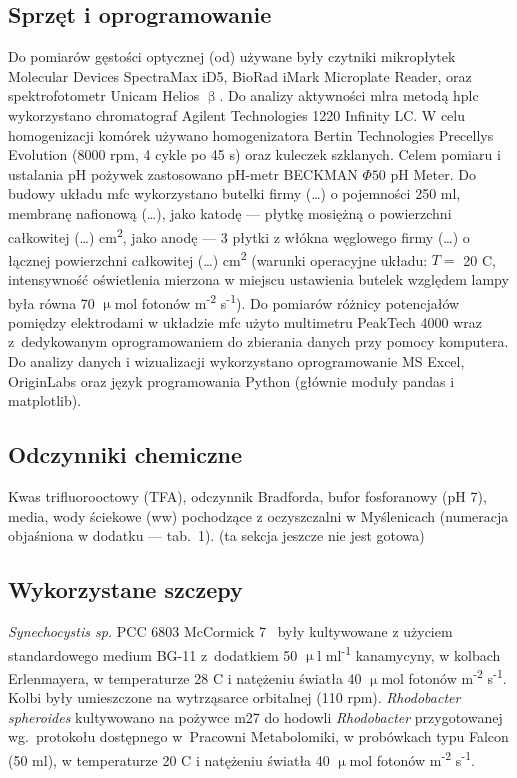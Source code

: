 \subsection{Sprzęt i oprogramowanie}\label{subsec:sprzet}
Do pomiarów gęstości optycznej (\acrshort{od}) używane były czytniki mikropłytek
Molecular Devices SpectraMax iD5, BioRad iMark
Microplate Reader, oraz spektrofotometr Unicam Helios $\upbeta$.
Do analizy aktywności \acrshort{mlra} metodą \acrshort{hplc} wykorzystano chromatograf
Agilent Technologies 1220 Infinity LC\@.
W celu homogenizacji komórek używano homogenizatora
Bertin Technologies Precellys Evolution (8000 rpm, 4 cykle po 45 s)
oraz kuleczek szklanych.
Celem pomiaru i ustalania pH pożywek zastosowano pH-metr
BECKMAN $\Phi 50$ pH Meter.
Do budowy układu \acrshort{mfc} wykorzystano butelki firmy (\ldots)
o pojemności 250 ml, membranę nafionową (\ldots),
jako katodę — płytkę mosiężną o powierzchni całkowitej (\ldots)
cm\textsuperscript{2}, jako anodę — 3 płytki z włókna węglowego firmy
(\ldots) o łącznej powierzchni całkowitej (\ldots) cm\textsuperscript{2}
(warunki operacyjne układu:
$T =$ 20 \degree C, intensywność oświetlenia mierzona w miejscu
ustawienia butelek względem lampy była równa
70 $\upmu$mol fotonów m\textsuperscript{-2} s\textsuperscript{-1}).
Do pomiarów różnicy potencjałów pomiędzy elektrodami
w układzie \acrshort{mfc} użyto multimetru PeakTech 4000 wraz
z~dedykowanym oprogramowaniem do zbierania danych przy pomocy komputera.
Do analizy danych i wizualizacji wykorzystano oprogramowanie
MS Excel, OriginLabs oraz język programowania Python
(głównie moduły pandas i matplotlib).

\subsection{Odczynniki chemiczne}\label{subsec:odczynniki}
Kwas trifluorooctowy (TFA), odczynnik Bradforda, bufor fosforanowy (pH 7),
media, wody ściekowe (\acrshort{ww}) pochodzące z oczyszczalni w Myślenicach
(numeracja objaśniona w dodatku — tab.\ 1).
(ta sekcja jeszcze nie jest gotowa)

\subsection{Wykorzystane szczepy}\label{subsec:szczepy}
\textit{Synechocystis sp.} PCC 6803 McCormick 7~\cite{Puchalski2021}
były kultywowane z użyciem standardowego medium BG-11 z~dodatkiem 50
$\upmu$l ml\textsuperscript{-1} kanamycyny, w kolbach Erlenmayera,
w temperaturze 28 \degree C i natężeniu światła
40 $\upmu$mol fotonów m\textsuperscript{-2} s\textsuperscript{-1}.
Kolbi były umieszczone na wytrząsarce orbitalnej (110 rpm).
\textit{Rhodobacter spheroides} kultywowano na pożywce \acrshort{m27}
do hodowli \textit{Rhodobacter} przygotowanej wg.\ protokołu
dostępnego w~Pracowni Metabolomiki, w probówkach typu
Falcon (50 ml), w temperaturze 20 \degree C i natężeniu światła
40 $\upmu$mol fotonów m\textsuperscript{-2} s\textsuperscript{-1}.

